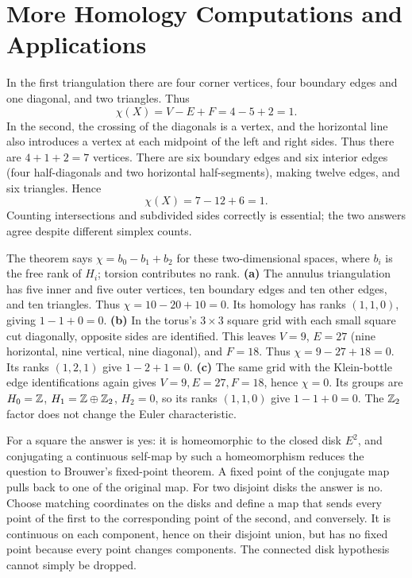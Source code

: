 \section{More Homology Computations and Applications}

In the first triangulation there are four corner vertices, four boundary edges and one diagonal, and two triangles. Thus
\[
\chi(X)=V-E+F=4-5+2=1.
\]
In the second, the crossing of the diagonals is a vertex, and the horizontal line also introduces a vertex at each midpoint of the left and right sides. Thus there are $4+1+2=7$ vertices. There are six boundary edges and six interior edges (four half-diagonals and two horizontal half-segments), making twelve edges, and six triangles. Hence
\[
\chi(X)=7-12+6=1.
\]
Counting intersections and subdivided sides correctly is essential; the two answers agree despite different simplex counts.

The theorem says $\chi=b_0-b_1+b_2$ for these two-dimensional spaces, where $b_i$ is the free rank of $H_i$; torsion contributes no rank.
\textbf{(a)} The annulus triangulation has five inner and five outer vertices, ten boundary edges and ten other edges, and ten triangles. Thus $\chi=10-20+10=0$. Its homology has ranks $(1,1,0)$, giving $1-1+0=0$.
\textbf{(b)} In the torus's $3\times3$ square grid with each small square cut diagonally, opposite sides are identified. This leaves $V=9$, $E=27$ (nine horizontal, nine vertical, nine diagonal), and $F=18$. Thus $\chi=9-27+18=0$. Its ranks $(1,2,1)$ give $1-2+1=0$.
\textbf{(c)} The same grid with the Klein-bottle edge identifications again gives $V=9,E=27,F=18$, hence $\chi=0$. Its groups are $H_0=\mathbb{Z}$, $H_1=\mathbb{Z}\oplus\mathbb{Z}_2$, $H_2=0$, so its ranks $(1,1,0)$ give $1-1+0=0$. The $\mathbb{Z}_2$ factor does not change the Euler characteristic.

For a square the answer is yes: it is homeomorphic to the closed disk $E^2$, and conjugating a continuous self-map by such a homeomorphism reduces the question to Brouwer's fixed-point theorem. A fixed point of the conjugate map pulls back to one of the original map.
For two disjoint disks the answer is no. Choose matching coordinates on the disks and define a map that sends every point of the first to the corresponding point of the second, and conversely. It is continuous on each component, hence on their disjoint union, but has no fixed point because every point changes components. The connected disk hypothesis cannot simply be dropped.

